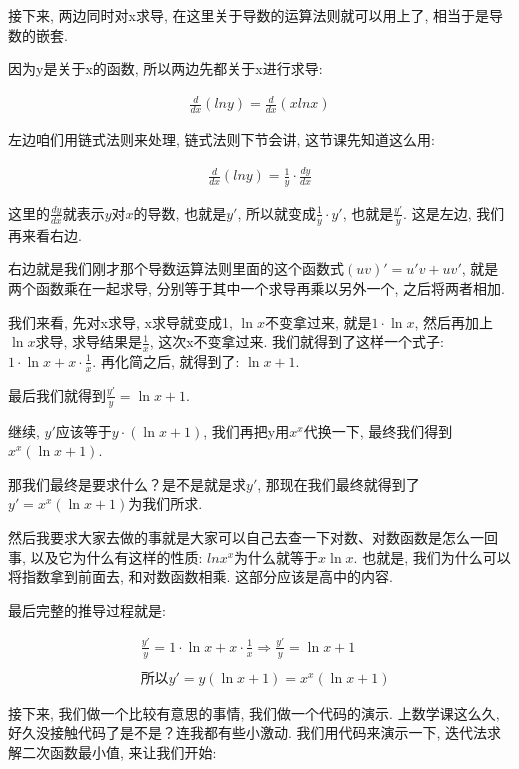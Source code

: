 接下来, 两边同时对x求导, 在这里关于导数的运算法则就可以用上了, 相当于是导数的嵌套.

因为y是关于x的函数, 所以两边先都关于x进行求导:

\begin{align*}
  \frac{d}{dx}(lny) = \frac{d}{dx}(xlnx) 
\end{align*}

左边咱们用链式法则来处理, 链式法则下节会讲, 这节课先知道这么用:

\begin{align*}
  \frac{d}{dx}(lny) = \frac{1}{y} \cdot \frac{dy}{dx} 
\end{align*}

这里的$\frac{dy}{dx}$就表示$y$对$x$的导数, 也就是$y'$, 所以就变成$\frac{1}{y} \cdot y'$, 也就是$\frac{y'}{y}$. 这是左边, 我们再来看右边. 

右边就是我们刚才那个导数运算法则里面的这个函数式$(uv)' = u'v+uv'$, 就是两个函数乘在一起求导, 分别等于其中一个求导再乘以另外一个, 之后将两者相加. 

我们来看, 先对x求导, x求导就变成1, $\ln x$不变拿过来, 就是$1 \cdot \ln x$, 然后再加上$\ln x$求导, 求导结果是$\frac{1}{x}$,  这次x不变拿过来. 我们就得到了这样一个式子: $1 \cdot \ln x + x \cdot \frac{1}{x}$. 再化简之后, 就得到了: $\ln x + 1$. 

最后我们就得到$\frac{y'}{y} = \ln x + 1$. 

继续, $y'$应该等于$y \cdot (\ln x + 1)$, 我们再把y用$x^x$代换一下, 最终我们得到$x^x(\ln x + 1)$. 

那我们最终是要求什么？是不是就是求$y'$, 那现在我们最终就得到了$y' = x^x(\ln x + 1)$为我们所求.

然后我要求大家去做的事就是大家可以自己去查一下对数、对数函数是怎么一回事, 以及它为什么有这样的性质: $ln x ^x$为什么就等于$x \ln x$. 也就是, 我们为什么可以将指数拿到前面去, 和对数函数相乘. 这部分应该是高中的内容. 

最后完整的推导过程就是: 

\begin{align*}
  & \frac{y'}{y} = 1 \cdot \ln x + x \cdot \frac{1}{x} \Rightarrow \frac{y'}{y} = \ln x + 1 \\ \\
  & \mbox{所以} y' = y(\ln x + 1) = x^x(\ln x + 1)
\end{align*}

接下来, 我们做一个比较有意思的事情, 我们做一个代码的演示. 上数学课这么久, 好久没接触代码了是不是？连我都有些小激动. 我们用代码来演示一下, 迭代法求解二次函数最小值, 来让我们开始: 

